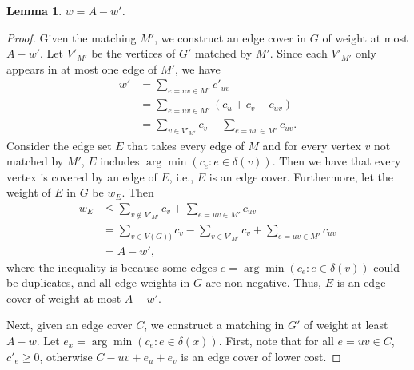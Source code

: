 \documentclass[11pt,letterpaper]{article}
\newtheorem{lemma}[theorem]{Lemma}
\theoremstyle{definition}
\begin{document}
\begin{lemma}
    $w = A - w'$.
\end{lemma}
\begin{proof}
    Given the matching $M'$, we construct an edge cover in $G$ of weight at most $A-w'$.
    Let $V'_{M'}$ be the vertices of $G'$ matched by $M'$.
    Since each $V'_{M'}$ only appears in at most one edge of $M'$, we have
    \begin{align*}
        w' &= \sum_{e=uv\in M'} c'_{uv} \\
        &= \sum_{e=uv\in M'} (c_{u}+ c_v - c_{uv}) \\
        &=\sum_{v\in V'_{M'}} c_{v} - \sum_{e=uv\in M'} c_{uv}.
    \end{align*}
    Consider the edge set $E$ that takes every edge of $M$ and for every vertex $v$ not matched by $M'$, $E$ includes $\arg\min(c_e : e \in \delta(v))$. 
    Then we have that every vertex is covered by an edge of $E$, i.e., $E$ is an edge cover.
    Furthermore, let the weight of $E$ in $G$ be $w_E$. Then
    \begin{align*}
        w_E &\leq \sum_{v\notin V'_{M'}} c_{v} + \sum_{e=uv\in M'} c_{uv} \\
        &= \sum_{v\in V(G))} c_{v} - \sum_{v\in V'_{M'}} c_{v} + \sum_{e=uv\in M'} c_{uv} \\
        &= A - w',
    \end{align*}
    where the inequality is because some edges $e=\arg\min(c_e : e \in \delta(v))$ could be duplicates, and all edge weights in $G$ are non-negative.
    Thus, $E$ is an edge cover of weight at most $A - w'$.

    Next, given an edge cover $C$, we construct a matching in $G'$ of weight at least $A-w$.
    Let $e_x=\arg\min(c_e : e \in \delta(x))$.
    First, note that for all $e=uv\in C$, $c'_e\geq 0$, otherwise $C-uv + e_u+e_v$ is an edge cover of lower cost.


\end{proof}
\end{document}

